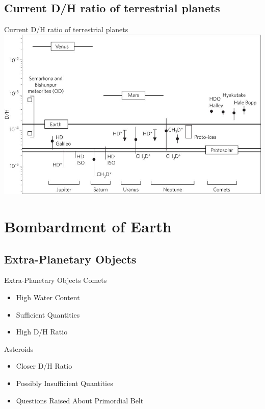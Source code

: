 \documentclass[11pt, aspectratio=169]{beamer}
\begin{document}
\subsection{Current D/H ratio of terrestrial planets}
\begin{frame}[t]{Current D/H ratio of terrestrial planets}
	\centering
	\includegraphics[height=.7\textheight]{figures/dh-ratio-terrestrial-planets.jpg}
\end{frame}



\section{Bombardment of Earth}
\subsection{Extra-Planetary Objects}
\begin{frame}[t]{Extra-Planetary Objects}
Comets
\begin{itemize}
	\item High Water Content
	\item Sufficient Quantities
	\item High D/H Ratio
\end{itemize}

Asteroids
\begin{itemize}
	\item Closer D/H Ratio
	\item Possibly Insufficient Quantities
	\item Questions Raised About Primordial Belt
\end{itemize}
\end{frame}
\end{document}
